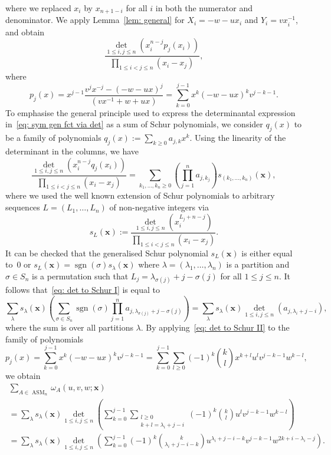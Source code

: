 \documentclass[11pt]{article}
\theoremstyle{definition}
\numberwithin{equation}{section}
\newcommand{\x}{\mathbf{x}}
\DeclareMathOperator{\ASM}{ASM}
\DeclareMathOperator{\sgn}{sgn}
\newcounter{x}
\newcounter{y}
\begin{document}
where we replaced $x_i$ by $x_{n+1-i}$ for all $i$ in both the numerator and denominator.
We apply Lemma~\ref{lem: general} for $X_i=-w-u x_i$ and $Y_i=v x_i^{-1}$, 
and obtain
\begin{equation}
\label{eq: sym gen fct via det}
\frac{\det_{1 \leq i,j \leq n}\left( x_i^{n-j}p_j(x_i) \right)}{\prod_{1 \leq i < j \leq n}(x_i-x_j)},
\end{equation}
where 
\[
p_j(x) = x^{j-1}\frac{v^j x^{-j}-\left( -w-u x\right)^j}{(v x^{-1}+w+u x)}
= \sum\limits_{k=0}^{j-1}x^k(-w-u x)^k  v^{j-k-1}.
\]
 To emphasise the general principle used to express the determinantal expression in~\eqref{eq: sym gen fct via det} as a sum of Schur polynomials, we consider $q_j(x)$ to be a family of polynomials $q_j(x):= \sum_{k\geq 0} a_{j,k} x^k$.
Using the linearity of the determinant in the columns, we have
\begin{equation}
\label{eq: det to Schur I}
\frac{\det\limits_{1 \leq i,j \leq n}\left( x_i^{n-j}q_j(x_i) \right)}{\prod\limits_{1 \leq i< j \leq n}(x_i-x_j)}
= \sum\limits_{k_1,\ldots,k_n \geq 0} \left( \prod_{j=1}^n a_{j,k_j} \right) s_{(k_1,\ldots, k_n)}(\mathbf{x}),
\end{equation}
where we used the well known extension of Schur polynomials to arbitrary sequences $L=(L_1,\ldots,L_n)$ of non-negative integers via
\[
s_{L}(\mathbf{x}) := \frac{\det\limits_{1 \leq i,j \leq n}\left( x_i^{L_j+n-j}\right)}{\prod\limits_{1 \leq i < j \leq n}(x_i-x_j)}.
\]
It can be checked that the generalised Schur polynomial $s_L(\mathbf{x})$ is either equal to~$0$ or $s_L(\mathbf{x})= \sgn(\sigma) s_\lambda(\mathbf{x})$ where $\lambda=(\lambda_1,\ldots, \lambda_n)$ is a partition 
and $\sigma \in S_n$ is a permutation such that $L_j=\lambda_{\sigma(j)}+j-\sigma(j)$ for all $1 \leq j \leq n$. It follows that~\eqref{eq: det to Schur I} is equal to
\begin{equation}
\label{eq: det to Schur II}
 \sum_{\lambda} s_\lambda(\mathbf{x}) \left( \sum_{\sigma \in S_n} \sgn(\sigma) \prod_{j=1}^n a_{j,\lambda_{\sigma(j)}+j-\sigma(j)}  \right)
= \sum_{\lambda} s_\lambda(\mathbf{x}) \det\limits_{1 \leq i,j \leq n} \left( a_{j,\lambda_i+j-i} \right),
\end{equation}
where the sum is over all partitions $\lambda$.
By applying~\eqref{eq: det to Schur II} to the family of polynomials 
\[
p_{j}(x) 
=\sum\limits_{k=0}^{j-1}x^k(-w-u x)^k  v^{j-k-1}
= \sum\limits_{k=0}^{j-1} \sum\limits_{l\geq 0}
(-1)^{k}\binom{k}{l} x^{k+l}   u^lv^{j-k-1} w^{k-l}
,
\]
we obtain
\begin{multline*}
\sum_{A \in \ASM_n}\omega_A(u,v,w;\x) \\=
\sum_\lambda s_\lambda(\mathbf{x}) \det\limits_{1 \leq i,j \leq n} \left( 
\sum\limits_{k=0}^{j-1}  \sum\limits_{\substack{l \geq 0 \\ k+l = \lambda_i+j-i}}
(-1)^{k}\binom{k}{l}   u^lv^{j-k-1} w^{k-l}
\right)\\
= \sum_\lambda s_\lambda(\mathbf{x})  \det_{1 \leq i,j \leq n} \left(
\sum_{k=0}^{j-1} (-1)^{k}\binom{k}{\lambda_i+j-i-k} u^{\lambda_i+j-i-k} v^{j-k-1} w^{2k+i-\lambda_i-j}
\right).
\end{multline*}
\end{document}
